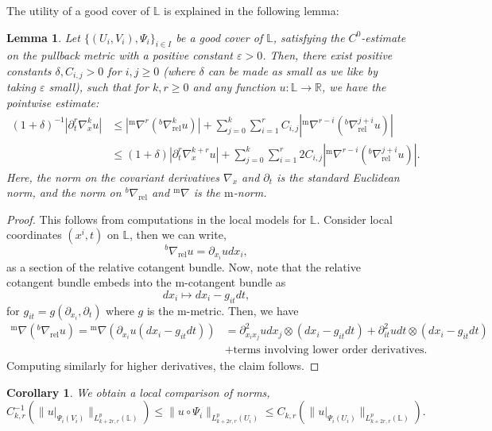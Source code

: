 \documentclass[10pt, a4paper]{article}
\theoremstyle{plain}%
\newtheorem{lem}[theorem]{Lemma}
\newtheorem{coro}[theorem]{Corollary}
\theoremstyle{definition}
\numberwithin{figure}{section}
\numberwithin{equation}{section}
\newcommand{\bL}{\mathbb{L}}
\newcommand{\bR}{\mathbb{R}}
\newcommand{\pa}{\partial}
\newcommand{\rt}{\rightarrow}
\newcommand{\ep}{\varepsilon}
\newcommand{\rel}{\mathrm{rel}}
\newcommand{\m}{\mathrm{m}}
\begin{document}
The utility of a good cover of $\bL$ is explained in the following lemma: 
\begin{lem}\label{lem_goodcoverestimates}
    Let $\{(U_i,V_i),\Psi_i\}_{i\in I}$ be a good cover of $\bL$, satisfying the $C^0$-estimate on the pullback metric with a positive constant $\ep >0$. Then, there exist positive constants $\delta, C_{i,j}>0$ for $i,j\geq0$ (where $\delta$ can be made as small as we like by taking $\ep$ small), such that for $k,r\geq0$ and any function $u:\bL\rt\bR$, we have the pointwise estimate:
    \begin{equation}
    	\begin{split}  (1+\delta)^{-1}|\pa_t^r\nabla^{k}_x u| &\leq | {^{\m}\nabla^{r}}({^b\nabla^k_\rel} u)| + \sum_{j=0}^{k}\sum_{i=1}^{r}C_{i,j}|{^{\m}\nabla^{r-i}}({^b\nabla_\rel^{j+i}}u)
    	| \\
    	&\leq (1+\delta) |\pa_t^r\nabla^{k+r}_x u| + \sum_{j=0}^{k}\sum_{i=1}^{r}2C_{i,j}|{^{\m}\nabla^{r-i}}({^b\nabla_\rel^{j+i}}u)
    	|.\end{split}
    	\end{equation}
    Here, the norm on the covariant derivatives $\nabla_x$ and $\pa_t$ is the standard Euclidean norm, and the norm on $^b\nabla_\rel$ and $^{\m}\nabla$ is the ${\m}$-norm.
\end{lem}
\begin{proof}
	This follows from computations in the local models for $\bL$. Consider local coordinates $(x^i,t)$ on $\bL$, then we can write, \[
	^b\nabla_\rel u = \pa_{x_i}udx_i,
	\]
	as a section of the relative cotangent bundle. Now, note that the relative cotangent bundle embeds into the m-cotangent bundle as \[
	dx_i \mapsto dx_i - g_{it}dt,
	\]
	for $g_{it}={g}(\pa_{x_i},\pa_t)$ where $g$ is the m-metric. Then, we have\begin{equation*}
		\begin{split}
	^{\m}\nabla(^b\nabla_\rel u) = {^{\m}\nabla}(\pa_{x_i}u(dx_i-g_{it}dt)) &= \pa^2_{x_ix_j}udx_j\otimes(dx_i-g_{it}dt)+ \pa^2_{it}udt\otimes(dx_i-g_{it}dt)\\
	&+\textrm{terms involving lower order derivatives}.
	\end{split}
	\end{equation*}
	Computing similarly for higher derivatives, the claim follows.
\end{proof}

\begin{coro}\label{coro_compnorms}
	We obtain a local comparison of norms, \[
		C_{k,r}^{-1}(\|u|_{\Psi_i(V_i)}\|_{L^p_{k+2r,r}(\bL)} )\leq \|u\circ\Psi_i\|_{L^p_{k+2r,r}(U_i)} \leq C_{k,r}(\|u|_{\Psi_i(U_i)}\|_{L^p_{k+2r,r}(\bL)}).
	\]
\end{coro}
\end{document}
